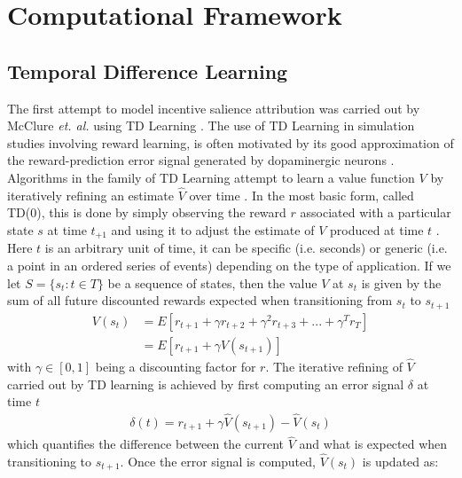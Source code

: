 \section{Computational Framework}
\label{comp_framework}
\lorem


\subsection{Temporal Difference Learning}
\label{td_learning}

The first attempt to model incentive salience attribution was carried out by McClure \textit{et. al.} using TD Learning \cite{mcclure2003computational}. The use of TD Learning in simulation studies involving reward learning, is often motivated by its good approximation of the reward-prediction error signal generated by dopaminergic neurons \cite{schultz1997neural,flagel2011selective}. Algorithms in the family of TD Learning attempt to learn a value function $V$ by iteratively refining an estimate $\widehat{V}$ over time \cite{sutton2018reinforcement}. In the most basic form, called TD(0), this is done by simply observing the reward $r$ associated with a particular state $s$ at time $t_{+1}$ and using it to adjust the estimate of $V$ produced at time $t$ \cite{sutton2018reinforcement}. Here $t$ is an arbitrary unit of time, it can be specific (i.e. seconds) or generic (i.e. a point in an ordered series of events) depending on the type of application. If we let $S=\{s_{t}: t \in T\}$ be a sequence of states, then the value $V$  at $s_{t}$ is given by the sum of all future discounted rewards expected when transitioning from $s_t$ to $s_{t+1}$
\begin{align}
\label{td_v}
    V(s_t) 
        &= E[
            r_{t+1} + 
            \gamma r_{t+2} + 
            \gamma^{2} r_{t+3} +
            ... +
            \gamma^{T} r_{T}
        ]\\
        &= E[
            r_{t+1} + 
            \gamma V(s_{t+1}) 
        ] \nonumber
\end{align}
with $\gamma \in [0, 1]$ being a discounting factor for $r$. The iterative refining of $\widehat{V}$ carried out by TD learning is achieved by first computing an error signal $\delta$ at time $t$
\begin{align}
    \label{td_error}
    \delta(t) = r_{t+1} + \gamma \widehat{V}(s_{t+1}) - \widehat{V}(s_{t})
\end{align}
which quantifies the difference between the current $\widehat{V}$ and what is expected when transitioning to $s_{t+1}$. Once the error signal is computed, $\widehat{V}(s_{t})$ is updated as: 
